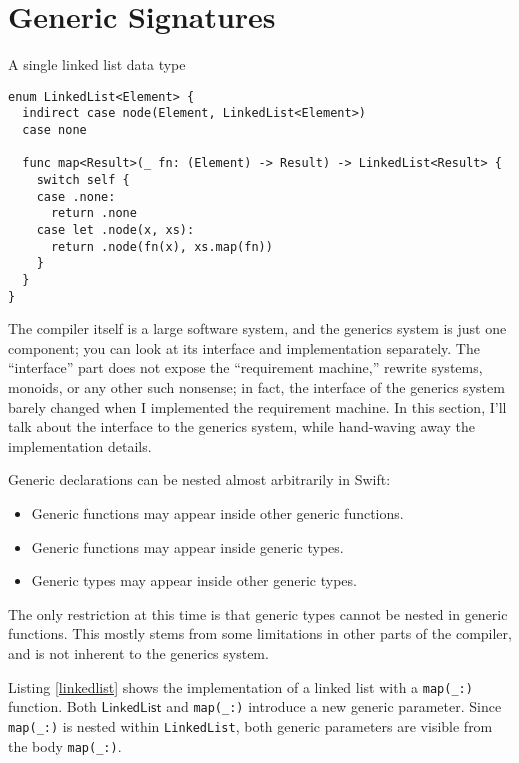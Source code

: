 \documentclass[headsepline,bibliography=totoc]{scrreport}
\newcommand{\namesym}[1]{\mathsf{#1}}
\theoremstyle{definition}
\theoremstyle{definition}
\theoremstyle{definition}
\begin{document}
\chapter{Generic Signatures}\label{genericsignatures}
\begin{listing}\caption{A single linked list data type}\label{linkedlist}
\begin{Verbatim}
enum LinkedList<Element> {
  indirect case node(Element, LinkedList<Element>)
  case none
  
  func map<Result>(_ fn: (Element) -> Result) -> LinkedList<Result> {
    switch self {
    case .none:
      return .none
    case let .node(x, xs):
      return .node(fn(x), xs.map(fn))
    }
  }
}
\end{Verbatim}
\end{listing}

The compiler itself is a large software system, and the generics system is just one component; you can look at its interface and implementation separately. The ``interface'' part does not expose the ``requirement machine,'' rewrite systems, monoids, or any other such nonsense; in fact, the interface of the generics system barely changed when I implemented the requirement machine. In this section, I'll talk about the interface to the generics system, while hand-waving away the implementation details.

Generic declarations can be nested almost arbitrarily in Swift:
\begin{itemize}
\item Generic functions may appear inside other generic functions.
\item Generic functions may appear inside generic types.
\item Generic types may appear inside other generic types.
\end{itemize}
The only restriction at this time is that generic types cannot be nested in generic functions. This mostly stems from some limitations in other parts of the compiler, and is not inherent to the generics system.

Listing \ref{linkedlist} shows the implementation of a linked list with a \texttt{map(\_:)} function. Both $\namesym{LinkedList}$ and \texttt{map(\_:)} introduce a new generic parameter. Since \texttt{map(\_:)} is nested within \texttt{LinkedList}, both generic parameters are visible from the body \texttt{map(\_:)}.
\end{document}
